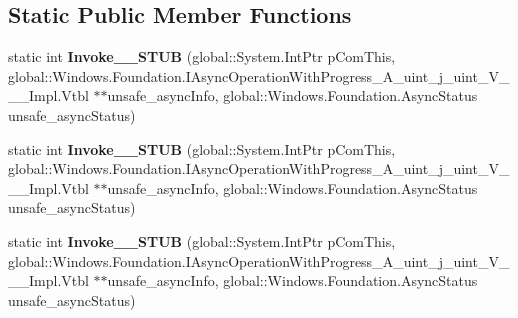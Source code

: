 \subsection*{Static Public Member Functions}
\begin{DoxyCompactItemize}
\item 
\mbox{\label{struct_windows_1_1_foundation_1_1_async_operation_with_progress_completed_handler___a__uint__j__uint___v_______impl_1_1_vtbl_a5972930593aafbdef3d2fe04490d375f}} 
static int {\bfseries Invoke\+\_\+\+\_\+\+S\+T\+UB} (global\+::\+System.\+Int\+Ptr p\+Com\+This, global\+::\+Windows.\+Foundation.\+I\+Async\+Operation\+With\+Progress\+\_\+\+A\+\_\+uint\+\_\+j\+\_\+uint\+\_\+\+V\+\_\+\+\_\+\+\_\+\+Impl.\+Vtbl $\ast$$\ast$unsafe\+\_\+async\+Info, global\+::\+Windows.\+Foundation.\+Async\+Status unsafe\+\_\+async\+Status)
\item 
\mbox{\label{struct_windows_1_1_foundation_1_1_async_operation_with_progress_completed_handler___a__uint__j__uint___v_______impl_1_1_vtbl_a5972930593aafbdef3d2fe04490d375f}} 
static int {\bfseries Invoke\+\_\+\+\_\+\+S\+T\+UB} (global\+::\+System.\+Int\+Ptr p\+Com\+This, global\+::\+Windows.\+Foundation.\+I\+Async\+Operation\+With\+Progress\+\_\+\+A\+\_\+uint\+\_\+j\+\_\+uint\+\_\+\+V\+\_\+\+\_\+\+\_\+\+Impl.\+Vtbl $\ast$$\ast$unsafe\+\_\+async\+Info, global\+::\+Windows.\+Foundation.\+Async\+Status unsafe\+\_\+async\+Status)
\item 
\mbox{\label{struct_windows_1_1_foundation_1_1_async_operation_with_progress_completed_handler___a__uint__j__uint___v_______impl_1_1_vtbl_a5972930593aafbdef3d2fe04490d375f}} 
static int {\bfseries Invoke\+\_\+\+\_\+\+S\+T\+UB} (global\+::\+System.\+Int\+Ptr p\+Com\+This, global\+::\+Windows.\+Foundation.\+I\+Async\+Operation\+With\+Progress\+\_\+\+A\+\_\+uint\+\_\+j\+\_\+uint\+\_\+\+V\+\_\+\+\_\+\+\_\+\+Impl.\+Vtbl $\ast$$\ast$unsafe\+\_\+async\+Info, global\+::\+Windows.\+Foundation.\+Async\+Status unsafe\+\_\+async\+Status)
\item 
\mbox{\label{struct_windows_1_1_foundation_1_1_async_operation_with_progress_completed_handler___a__uint__j__uint___v_______impl_1_1_vtbl_a5972930593aafbdef3d2fe04490d375f}} 
$$
\end{DoxyCompactItemize}
